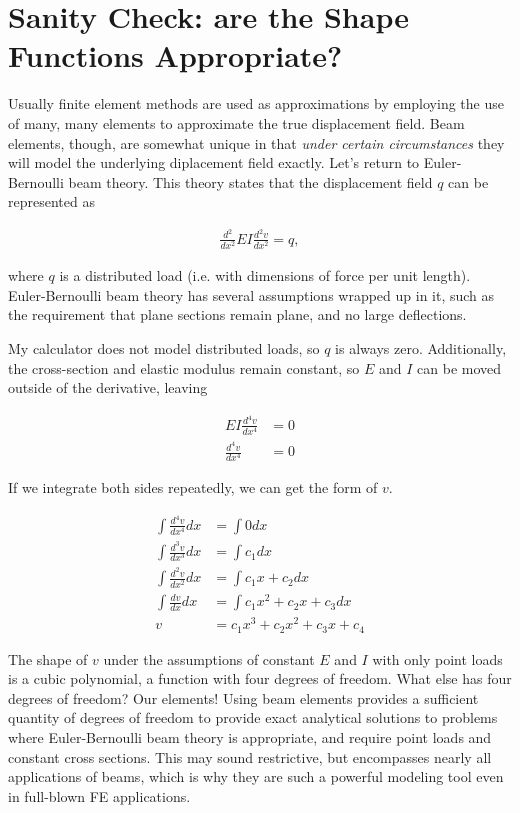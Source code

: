 \documentclass[10pt,letterpaper]{article}
\begin{document}
	\section{Sanity Check: are the Shape Functions Appropriate?}

	Usually finite element methods are used as approximations by employing the use of many, many elements to approximate the true displacement field. Beam elements, though, are somewhat unique in that \textit{under certain circumstances} they will model the underlying diplacement field exactly. Let's return to Euler-Bernoulli beam theory. This theory states that the displacement field $q$ can be represented as 

	\begin{align}
		\frac{d^2}{d x^2} E I \frac{d^2 v}{d x^2} = q ,
	\end{align}

	where $q$ is a distributed load (i.e. with dimensions of force per unit length). Euler-Bernoulli beam theory has several assumptions wrapped up in it, such as the requirement that plane sections remain plane, and no large deflections.

	My calculator does not model distributed loads, so $q$ is always zero. Additionally, the cross-section and elastic modulus remain constant, so $E$ and $I$ can be moved outside of the derivative, leaving

	\begin{align}
		E I \frac{d^4 v}{d x^4} &= 0 \\
		\frac{d^4 v}{d x^4} &= 0 
	\end{align}

	If we integrate both sides repeatedly, we can get the form of $v$.

	\begin{align}
		\int \frac{d^4 v}{d x^4} dx &= \int 0 dx \\
		\int \frac{d^3 v}{d x^3} dx &= \int c_1 dx \\
		\int \frac{d^2 v}{d x^2} dx &= \int c_1 x + c_2 dx \\
		\int \frac{d v}{d x} dx     &= \int c_1 x^2 + c_2 x + c_3 dx \\
		v &= c_1 x^3 + c_2 x^2 + c_3 x + c_4 
	\end{align}

	The shape of $v$ under the assumptions of constant $E$ and $I$ with only point loads is a cubic polynomial, a function with four degrees of freedom. What else has four degrees of freedom? Our elements! Using beam elements provides a sufficient quantity of degrees of freedom to provide exact analytical solutions to problems where Euler-Bernoulli beam theory is appropriate, and require point loads and constant cross sections. This may sound restrictive, but encompasses nearly all applications of beams, which is why they are such a powerful modeling tool even in full-blown FE applications.
\end{document}
